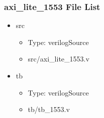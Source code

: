 \subsubsection{axi\_lite\_1553 File List}
\begin{itemize}
\item src
	\begin{itemize}
	\item[$\space$] Type: verilogSource
	\item src/axi\_lite\_1553.v
	\end{itemize}
\item tb
	\begin{itemize}
	\item[$\space$] Type: verilogSource
	\item tb/tb\_1553.v
	\end{itemize}
\end{itemize}
